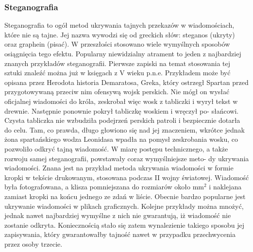 \documentclass[a4paper]{article}
\begin{document}
\subsubsection{Steganografia}
Steganografia to ogół metod ukrywania tajnych przekazów w wiadomościach, które nie są tajne.
Jej nazwa wywodzi się od greckich słów: steganos (ukryty) oraz graphein (pisać). W przeszłości
stosowano wiele wymyślnych sposobów osiągnięcia tego efektu. Popularny niewidzialny atrament
to jeden z najbardziej znanych przykładów steganografii. Pierwsze zapiski na temat stosowania
tej sztuki znaleźć można już w księgach z V wieku p.n.e. Przykładem może być opisana przez
Herodota historia Demaratosa, Greka, który ostrzegł Spartan przed przygotowywaną przeciw nim
ofensywą wojsk perskich. Nie mógł on wysłać oficjalnej wiadomości do króla, zeskrobał więc wosk
z tabliczki i wyrył tekst w drewnie. Następnie ponownie pokrył tabliczkę woskiem i wręczył po-
słańcowi. Czysta tabliczka nie wzbudziła podejrzeń perskich patroli i bezpiecznie dotarła do celu.
Tam, co prawda, długo głowiono się nad jej znaczeniem, wkrótce jednak żona spartańskiego wodza
Leonidasa wpadła na pomysł zeskrobania wosku, co pozwoliło odkryć tajną wiadomość. W miarę
postępu technicznego, a także rozwoju samej steganografii, powstawały coraz wymyślniejsze meto-
dy ukrywania wiadomości. Znana jest na przykład metoda ukrywania wiadomości w formie kropki
w tekście drukowanym, stosowana podczas II wojny światowej. Wiadomość była fotografowana,
a klisza pomniejszana do rozmiarów około mm$^2$ i naklejana zamiast kropki na końcu jednego ze
zdań w liście. Obecnie bardzo popularne jest ukrywanie wiadomości w plikach graficznych. Kolejne
przykłady można mnożyć, jednak nawet najbardziej wymyślne z nich nie gwarantują, iż wiadomość
nie zostanie odkryta. Koniecznością stało się zatem wynalezienie takiego sposobu jej zapisywania,
który gwarantowałby tajność nawet w przypadku przechwycenia przez osoby trzecie.
\end{document}
